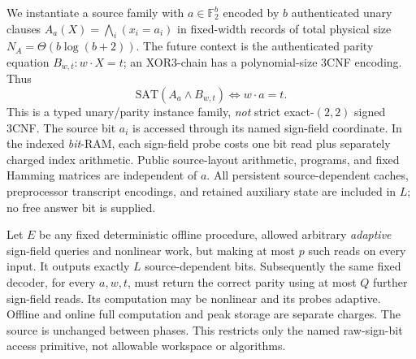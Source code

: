 \documentclass[10pt]{article}
\newcommand{\F}{\mathbb F_2}
\begin{document}
We instantiate a source family with $a\in\F^b$ encoded by $b$ authenticated unary clauses $A_a(X)=\bigwedge_i(x_i=a_i)$ in fixed-width records of total physical size $N_A=\Theta(b\log(b+2))$. The future context is the authenticated parity equation $B_{w,t}:w\cdot X=t$; an XOR3-chain has a polynomial-size 3CNF encoding. Thus
\[
 \mathrm{SAT}(A_a\land B_{w,t})\iff w\cdot a=t.
\]
This is a typed unary/parity instance family, \emph{not} strict exact-$(2,2)$ signed 3CNF. The source bit $a_i$ is accessed through its named sign-field coordinate. In the indexed \emph{bit}-RAM, each sign-field probe costs one bit read plus separately charged index arithmetic. Public source-layout arithmetic, programs, and fixed Hamming matrices are independent of $a$. All persistent source-dependent caches, preprocessor transcript encodings, and retained auxiliary state are included in $L$; no free answer bit is supplied.

Let $E$ be any fixed deterministic offline procedure, allowed arbitrary \emph{adaptive} sign-field queries and nonlinear work, but making at most $p$ such reads on every input. It outputs exactly $L$ source-dependent bits. Subsequently the same fixed decoder, for every $a,w,t$, must return the correct parity using at most $Q$ further sign-field reads. Its computation may be nonlinear and its probes adaptive. Offline and online full computation and peak storage are separate charges. The source is unchanged between phases. This restricts only the named raw-sign-bit access primitive, not allowable workspace or algorithms.
\end{document}
